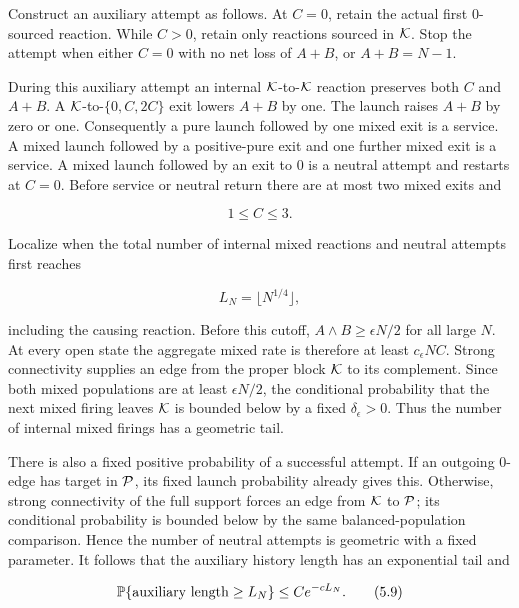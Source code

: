 Construct an auxiliary attempt as follows. At \(C=0\), retain the actual
first \(0\)-sourced reaction. While \(C>0\), retain only reactions
sourced in \({\cal K}\). Stop the attempt when either \(C=0\) with no
net loss of \(A+B\), or \(A+B=N-1\).

During this auxiliary attempt an internal \({\cal K}\)-to-\({\cal K}\)
reaction preserves both \(C\) and \(A+B\). A
\({\cal K}\)-to-\(\{0,C,2C\}\) exit lowers \(A+B\) by one. The launch
raises \(A+B\) by zero or one. Consequently a pure launch followed by
one mixed exit is a service. A mixed launch followed by a positive-pure
exit and one further mixed exit is a service. A mixed launch followed by
an exit to \(0\) is a neutral attempt and restarts at \(C=0\). Before
service or neutral return there are at most two mixed exits and

\[
                              1\le C\le3.                        \tag{5.7}
\]

Localize when the total number of internal mixed reactions and neutral
attempts first reaches

\[
                         L_N=\lfloor N^{1/4}\rfloor,            \tag{5.8}
\]

including the causing reaction. Before this cutoff,
\(A\wedge B\ge\epsilon N/2\) for all large \(N\). At every open state
the aggregate mixed rate is therefore at least \(c_\epsilon NC\). Strong
connectivity supplies an edge from the proper block \({\cal K}\) to its
complement. Since both mixed populations are at least \(\epsilon N/2\),
the conditional probability that the next mixed firing leaves
\({\cal K}\) is bounded below by a fixed \(\delta_\epsilon>0\). Thus the
number of internal mixed firings has a geometric tail.

There is also a fixed positive probability of a successful attempt. If
an outgoing \(0\)-edge has target in \({\cal P}\), its fixed launch
probability already gives this. Otherwise, strong connectivity of the
full support forces an edge from \({\cal K}\) to \({\cal P}\); its
conditional probability is bounded below by the same balanced-population
comparison. Hence the number of neutral attempts is geometric with a
fixed parameter. It follows that the auxiliary history length has an
exponential tail and

\[
              \mathbb P\{\hbox{auxiliary length}\ge L_N\}
                       \le C e^{-cL_N}.                         \tag{5.9}
\]

